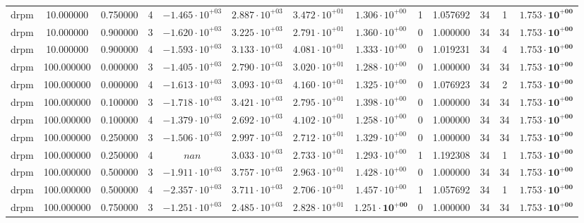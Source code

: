 \begin{table}
\begin{tabular}{ccccccccccccc}
drpm & 10.000000 & 0.750000 & 4 & $-1.465 \cdot 10^{+03}$ & $2.887 \cdot 10^{+03}$ & $3.472 \cdot 10^{+01}$ & $1.306 \cdot 10^{+00}$ & 1 & 1.057692 & 34 & 1 & $\mathbf{1.753 \cdot 10^{+00}}$ \\
drpm & 10.000000 & 0.900000 & 3 & $-1.620 \cdot 10^{+03}$ & $3.225 \cdot 10^{+03}$ & $2.791 \cdot 10^{+01}$ & $1.360 \cdot 10^{+00}$ & 0 & 1.000000 & 34 & 34 & $\mathbf{1.753 \cdot 10^{+00}}$ \\
drpm & 10.000000 & 0.900000 & 4 & $-1.593 \cdot 10^{+03}$ & $3.133 \cdot 10^{+03}$ & $4.081 \cdot 10^{+01}$ & $1.333 \cdot 10^{+00}$ & 0 & 1.019231 & 34 & 4 & $\mathbf{1.753 \cdot 10^{+00}}$ \\
drpm & 100.000000 & 0.000000 & 3 & $-1.405 \cdot 10^{+03}$ & $2.790 \cdot 10^{+03}$ & $3.020 \cdot 10^{+01}$ & $1.288 \cdot 10^{+00}$ & 0 & 1.000000 & 34 & 34 & $\mathbf{1.753 \cdot 10^{+00}}$ \\
drpm & 100.000000 & 0.000000 & 4 & $-1.613 \cdot 10^{+03}$ & $3.093 \cdot 10^{+03}$ & $4.160 \cdot 10^{+01}$ & $1.325 \cdot 10^{+00}$ & 0 & 1.076923 & 34 & 2 & $\mathbf{1.753 \cdot 10^{+00}}$ \\
drpm & 100.000000 & 0.100000 & 3 & $-1.718 \cdot 10^{+03}$ & $3.421 \cdot 10^{+03}$ & $2.795 \cdot 10^{+01}$ & $1.398 \cdot 10^{+00}$ & 0 & 1.000000 & 34 & 34 & $\mathbf{1.753 \cdot 10^{+00}}$ \\
drpm & 100.000000 & 0.100000 & 4 & $-1.379 \cdot 10^{+03}$ & $2.692 \cdot 10^{+03}$ & $4.102 \cdot 10^{+01}$ & $1.258 \cdot 10^{+00}$ & 0 & 1.000000 & 34 & 34 & $\mathbf{1.753 \cdot 10^{+00}}$ \\
drpm & 100.000000 & 0.250000 & 3 & $-1.506 \cdot 10^{+03}$ & $2.997 \cdot 10^{+03}$ & $2.712 \cdot 10^{+01}$ & $1.329 \cdot 10^{+00}$ & 0 & 1.000000 & 34 & 34 & $\mathbf{1.753 \cdot 10^{+00}}$ \\
drpm & 100.000000 & 0.250000 & 4 & $nan$ & $3.033 \cdot 10^{+03}$ & $2.733 \cdot 10^{+01}$ & $1.293 \cdot 10^{+00}$ & 1 & 1.192308 & 34 & 1 & $\mathbf{1.753 \cdot 10^{+00}}$ \\
drpm & 100.000000 & 0.500000 & 3 & $-1.911 \cdot 10^{+03}$ & $3.757 \cdot 10^{+03}$ & $2.963 \cdot 10^{+01}$ & $1.428 \cdot 10^{+00}$ & 0 & 1.000000 & 34 & 34 & $\mathbf{1.753 \cdot 10^{+00}}$ \\
drpm & 100.000000 & 0.500000 & 4 & $-2.357 \cdot 10^{+03}$ & $3.711 \cdot 10^{+03}$ & $2.706 \cdot 10^{+01}$ & $1.457 \cdot 10^{+00}$ & 1 & 1.057692 & 34 & 1 & $\mathbf{1.753 \cdot 10^{+00}}$ \\
drpm & 100.000000 & 0.750000 & 3 & $-1.251 \cdot 10^{+03}$ & $2.485 \cdot 10^{+03}$ & $2.828 \cdot 10^{+01}$ & $\mathbf{1.251 \cdot 10^{+00}}$ & 0 & 1.000000 & 34 & 34 & $\mathbf{1.753 \cdot 10^{+00}}$ \\

\end{tabular}
\end{table}
